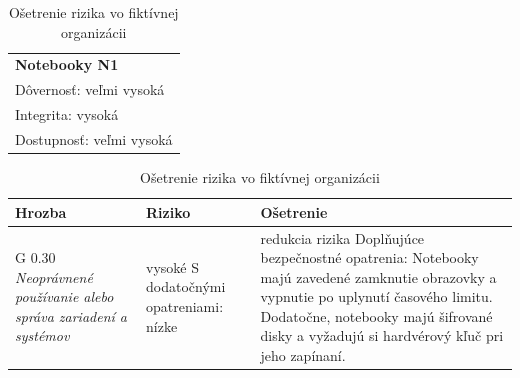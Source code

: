 \begin{table}[h!]

\begin{tabular}{|p{\textwidth}|}
\hline
\rowcolor{headerblue}
\textbf{Notebooky N1} \\
\rowcolor{headerblue}
Dôvernosť: veľmi vysoká \\
\rowcolor{headerblue}
Integrita: vysoká \\
\rowcolor{headerblue}
Dostupnosť: veľmi vysoká \\
\hline
\end{tabular}

\begin{tabular}{|p{}|p{}|p{}|}
\hline
Hrozba & Riziko & Ošetrenie
\\
\hline
G 0.30 \textit{Neoprávnené používanie alebo správa zariadení a systémov}
&
\colorbox{riskyellow}{vysoké}
\newline\newline
S dodatočnými opatreniami:
\newline
\colorbox{riskgreen}{nízke}
& redukcia rizika
\newline
Doplňujúce bezpečnostné opatrenia:
Notebooky majú zavedené zamknutie obrazovky a vypnutie po uplynutí časového limitu. Dodatočne, notebooky majú
šifrované disky a vyžadujú si hardvérový kľuč pri jeho zapínaní.
\\
\hline
\end{tabular}
\caption{Ošetrenie rizika vo fiktívnej organizácii}
\label{tbl:risktreatmentexample}
\end{table}